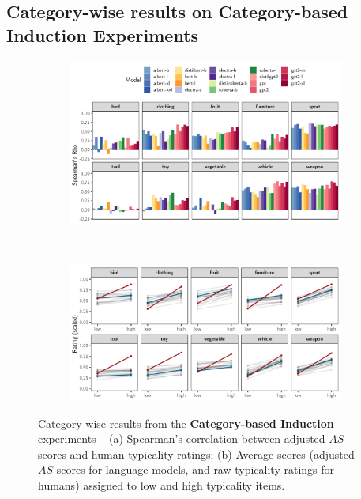 \documentclass[a4paper, 11pt]{article}
\begin{document}
\subsection{Category-wise results on Category-based Induction Experiments}

\begin{figure}[h]
    \centering
    \begin{subfigure}[b]{\textwidth}
        \includegraphics[width = \textwidth]{../paper/induction_categorywise.pdf}
        \caption{}
    \end{subfigure}\\
    \vspace{1em}
    \begin{subfigure}[b]{\textwidth}
        \includegraphics[width = \textwidth]{../paper/inductioncategorywiselowhigh.pdf}
        \caption{}
    \end{subfigure}
    \caption{Category-wise results from the \textbf{Category-based Induction} experiments -- (a) Spearman's correlation between adjusted $AS$-scores and human typicality ratings; (b) Average scores (adjusted $AS$-scores for language models, and raw typicality ratings for humans) assigned to low and high typicality items.}
\end{figure}
\end{document}
